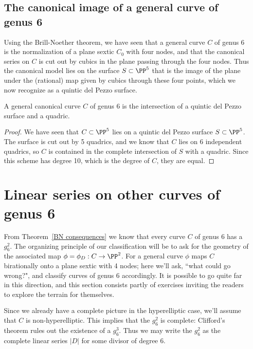 \subsection{The canonical image of a general curve of genus 6}

Using the Brill-Noether theorem, we have seen that a general curve $C$ of genus 6 is the normalization of a plane sextic $C_0$ with four nodes, and that the canonical series on $C$ is cut out by cubics in the plane passing through the four nodes. Thus the canonical model lies on the surface $S \subset \PP^5$ that is the image of the plane under the (rational) map given by cubics through these four points, which we now recognize as a quintic del Pezzo surface.

\begin{theorem}
A general canonical curve $C$ of genus 6 is the intersection of a quintic del Pezzo surface and a quadric. 
\end{theorem}

\begin{proof}
We have seen that $C \subset \PP^5$ lies on a quintic del Pezzo surface $S \subset \PP^5$. The surface is cut out by 5 quadrics, and we know that $C$ lies on 6 independent quadrics,
so $C$ is contained in the complete intersection of $S$ with a quadric. Since this scheme has degree 10, which is the degree of $C$, they are equal.
\end{proof}


\section{Linear series on other curves of genus 6}

From Theorem~\ref{BN consequences}  we know that every curve $C$ of genus 6 has a $g^{2}_{6}$. The organizing principle of our classification will be to ask for the geometry of the associated map $\phi = \phi_D : C \to \PP^2$. For a general curve  $\phi$ maps $C$ birationally onto a plane sextic with 4 nodes; here we'll ask, ``what could go wrong?", and classify curves of genus 6 accordingly. It is possible to go quite far 
in this direction, and this section consists partly of exercises inviting the readers to explore the terrain for themselves.

Since we already have a complete picture in the hyperelliptic case, we'll assume that $C$ is non-hyperelliptic. This implies that  the $g^2_6$ is complete: Clifford's theorem rules out
the existence of a $g^3_6$. Thus we may write the $g^{2}_{6}$ as the complete linear series
$|D|$ for some divisor of degree 6.

